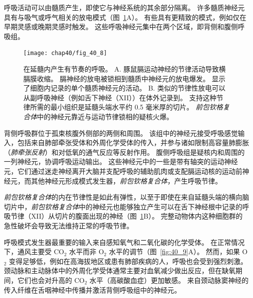 呼吸活动可以由髓质产生，即使它与神经系统的其余部分隔离。
许多髓质神经元具有与吸气或呼气相关的放电模式（图~\ref{fig:40_8}A）。
有些具有更精致的模式，例如仅在早期灵感或晚期灵感时触发。
这些呼吸神经元集中在两个区域，即背侧和腹侧呼吸组。


\begin{figure}[htbp]
	\centering
	\texttt{[image: chap40/fig\_40\_8]}
	\caption{在延髓内产生有节奏的呼吸。 
		A. 豚鼠膈运动神经的节律活动导致横膈膜收缩。
		膈神经的放电被锁相到髓质中神经元的放电爆发。
		显示了细胞内记录的单个髓质神经元的活动\cite{richerson1987maintenance}。
		B. 类似的节律性放电可以从副呼吸神经（例如舌下神经（XII））在体外记录到。
		支持这种节律所需的最小组织是延髓头端水平约 0.5 毫米厚的切片。
		\textit{前包钦格复合体}中的神经元靠近与运动节律锁相的疑核火爆\cite{smith1991pre}。}
	\label{fig:40_8}
\end{figure}


背侧呼吸群位于孤束核腹外侧部的两侧和周围。
该组中的神经元接受呼吸感觉输入，包括来自肺部牵张受体和外周化学受体的传入，并参与诸如限制高容量肺膨胀（\textit{肺牵张反射}）和对低氧的通气反应等反射作用。
腹侧呼吸组是疑核内和周围的一列神经元，协调呼吸运动输出。
这些神经元中的一些是带有轴突的运动神经元，它们通过迷走神经离开大脑并支配呼吸的辅助肌肉或支配膈运动核的运动前神经元，而其他神经元形成模式发生器，\textit{前包钦格复合体}，产生呼吸节律。


\textit{前包钦格复合体}的内在节律性是如此有弹性，以至于即使在来自延髓头端的横向脑切片中，\textit{前包钦格复合体}中的神经元也能够独立产生可以在舌下神经根中记录的呼吸节律（XII）从切片的腹面出现的神经（图~\ref{fig:40_8}B）。
完整动物体内这种细胞群的急性破坏会导致无法维持正常的呼吸节律。


呼吸模式发生器最重要的输入来自感知氧气和二氧化碳的化学受体。
在正常情况下，通风主要受 CO$_2$ 水平而非 O$_2$ 水平的调节（图~\ref{fig:40_9}A）。
然而，如果 O$_2$ 变得足够低，例如在高海拔地区或患有肺部疾病的人，呼吸也会受到强烈刺激。
颈动脉和主动脉体中的外周化学受体通常主要对血氧减少做出反应，但在缺氧期间，它们也会对升高的 CO$_2$ 水平（高碳酸血症）更加敏感。
来自颈动脉窦神经的传入纤维在舌咽神经中传播并激活背侧呼吸组中的神经元。


